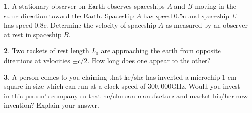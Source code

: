 \documentclass[10pt, twocolumn]{article}
\theoremstyle{definition}
\newtheorem{q}{}
\begin{document}
		\begin{q}
			A stationary observer on Earth observes spaceships $ A $ and $ B $ moving in the same direction toward the Earth. Spaceship $ A $ has speed $ 0.5 $c and spaceship $ B $ has speed $ 0.8 $c. Determine the velocity of spaceship $ A $ as measured by an observer at rest in spaceship $ B $.
		\end{q}
		\begin{q}
			Two rockets of rest length $ L_0 $ are approaching the earth from opposite directions at velocities $ \pm c/2 $. How long does one appear to the other?
		\end{q}
		\begin{q}
			A person comes to you claiming that he/she has invented a microchip $ 1 $ cm square in size which can run at a clock speed of $ 300,000  $GHz.
			Would you invest in this person's company so that he/she can manufacture and market his/her new invention? Explain your answer. 
		\end{q}
\end{document}

